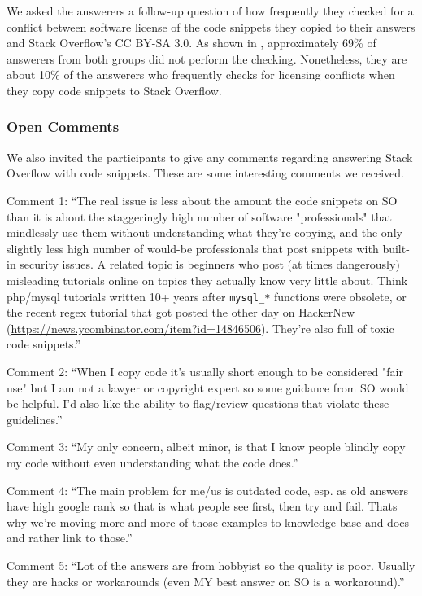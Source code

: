 \documentclass[10pt,journal,compsoc]{IEEEtran}
\begin{document}
We asked the answerers a follow-up question of how frequently they checked for a conflict between software license of the code snippets they copied to their answers and Stack Overflow's CC BY-SA 3.0. As shown in , approximately 69\% of answerers from both groups did not perform the checking. Nonetheless, they are about 10\% of the answerers who frequently checks for licensing conflicts when they copy code snippets to Stack Overflow.

\subsubsection{Open Comments} 
We also invited the participants to give any comments regarding answering Stack Overflow with code snippets. These are some interesting comments we received.

Comment 1: ``The real issue is less about the amount the code snippets on SO than it is about the staggeringly high number of software "professionals" that mindlessly use them without understanding what they're copying, and the only slightly less high number of would-be professionals that post snippets with built-in security issues.  A related topic is beginners who post (at times dangerously) misleading tutorials online on topics they actually know very little about. Think php/mysql tutorials written 10+ years after \texttt{mysql\_*} functions were obsolete, or the recent regex tutorial that got posted the other day on HackerNew (\url{https://news.ycombinator.com/item?id=14846506}). They're also full of toxic code snippets.''

Comment 2: ``When I copy code it's usually short enough to be considered "fair use" but I am not a lawyer or copyright expert so some guidance from SO would be helpful. I'd also like the ability to flag/review questions that violate these guidelines.''

Comment 3: ``My only concern, albeit minor, is that I know people blindly copy my code without even understanding what the code does.''

Comment 4: ``The main problem for me/us is outdated code, esp. as old answers have high google rank so that is what people see first, then try and fail. Thats why we're moving more and more of those examples to knowledge base and docs and rather link to those.''

Comment 5: ``Lot of the answers are from hobbyist so the quality is poor. Usually they are hacks or workarounds (even MY best answer on SO is a workaround).''
\end{document}
